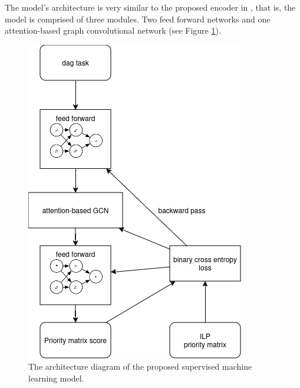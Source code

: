 The model's architecture is very similar to the proposed encoder in \citet{Lee2021GlobalDagSchedDRL},
that is, the model is comprised of three modules.
Two feed forward networks and one attention-based graph convolutional network (see Figure \ref{fig:model_diagram}).

\begin{figure}
    \centering
    \includegraphics[width=\linewidth]{images/designed_model.png}
    \caption{The architecture diagram of the proposed supervised machine learning model.}
    \label{fig:model_diagram}
\end{figure}

